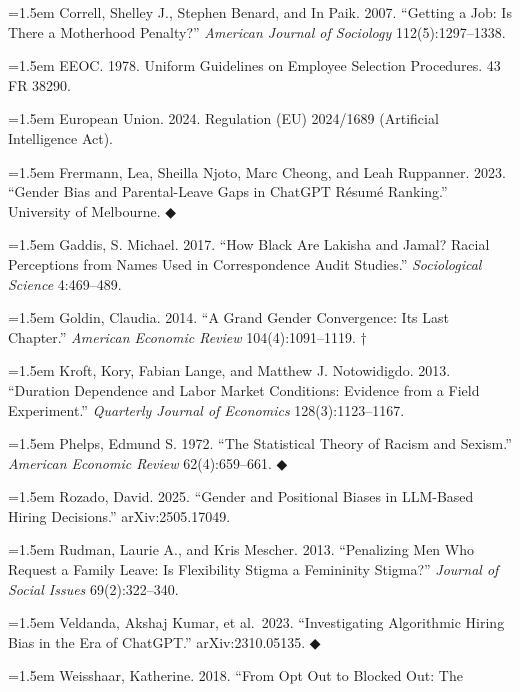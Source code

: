 \documentclass[11pt]{article}
\begin{document}
{\noindent\hangindent=1.5em Correll, Shelley J., Stephen Benard, and In Paik. 2007. ``Getting a Job:
Is There a Motherhood Penalty?'' \emph{American Journal of Sociology}
112(5):1297--1338.\par\smallskip
\noindent\hangindent=1.5em EEOC. 1978. Uniform Guidelines on Employee Selection Procedures. 43 FR
38290.\par\smallskip
\noindent\hangindent=1.5em European Union. 2024. Regulation (EU) 2024/1689 (Artificial Intelligence
Act).\par\smallskip
\noindent\hangindent=1.5em Frermann, Lea, Sheilla Njoto, Marc Cheong, and Leah Ruppanner. 2023.
``Gender Bias and Parental-Leave Gaps in ChatGPT Résumé Ranking.''
University of Melbourne. ◆\par\smallskip
\noindent\hangindent=1.5em Gaddis, S. Michael. 2017. ``How Black Are Lakisha and Jamal? Racial
Perceptions from Names Used in Correspondence Audit Studies.''
\emph{Sociological Science} 4:469--489.\par\smallskip
\noindent\hangindent=1.5em Goldin, Claudia. 2014. ``A Grand Gender Convergence: Its Last Chapter.''
\emph{American Economic Review} 104(4):1091--1119. †\par\smallskip
\noindent\hangindent=1.5em Kroft, Kory, Fabian Lange, and Matthew J. Notowidigdo. 2013. ``Duration
Dependence and Labor Market Conditions: Evidence from a Field
Experiment.'' \emph{Quarterly Journal of Economics} 128(3):1123--1167.\par\smallskip
\noindent\hangindent=1.5em Phelps, Edmund S. 1972. ``The Statistical Theory of Racism and Sexism.''
\emph{American Economic Review} 62(4):659--661. ◆\par\smallskip
\noindent\hangindent=1.5em Rozado, David. 2025. ``Gender and Positional Biases in LLM-Based Hiring
Decisions.'' arXiv:2505.17049.\par\smallskip
\noindent\hangindent=1.5em Rudman, Laurie A., and Kris Mescher. 2013. ``Penalizing Men Who Request
a Family Leave: Is Flexibility Stigma a Femininity Stigma?''
\emph{Journal of Social Issues} 69(2):322--340.\par\smallskip
\noindent\hangindent=1.5em Veldanda, Akshaj Kumar, et al.~2023. ``Investigating Algorithmic Hiring
Bias in the Era of ChatGPT.'' arXiv:2310.05135. ◆\par\smallskip
\noindent\hangindent=1.5em Weisshaar, Katherine. 2018. ``From Opt Out to Blocked Out: The
}
\end{document}

